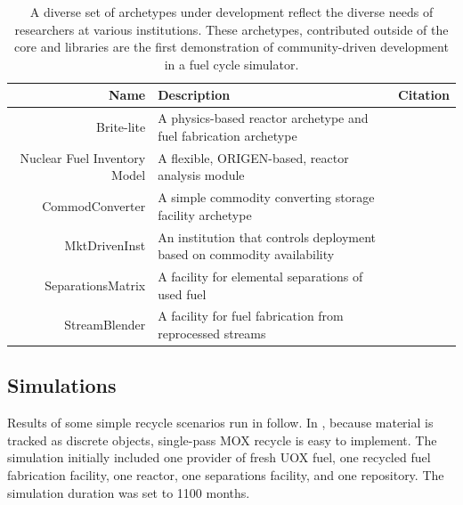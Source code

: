 \begin{table}[h]
\centering
\begin{tabularx}{\textwidth}{|r|X|r|}
\hline
\textbf{Name} & \textbf{Description} & \textbf{Citation} \\
\hline
Brite-lite & A physics-based reactor archetype and fuel fabrication archetype & \cite{brightlite} \\
Nuclear Fuel Inventory Model & A flexible, ORIGEN-based, reactor analysis module & \cite{NFIM} \\
CommodConverter & A simple commodity converting storage facility archetype  & \cite{commodconverter} \\
MktDrivenInst & An institution that controls deployment based on commodity availability & \cite{mktdriveninst} \\
SeparationsMatrix & A facility for elemental separations of used fuel & \cite{streamblender} \\
StreamBlender & A facility for fuel fabrication from reprocessed streams & \cite{streamblender} \\
\hline
\end{tabularx}
\caption{A diverse set of archetypes under development reflect the diverse 
needs of researchers at various institutions. These archetypes, contributed 
outside of the \Cyclus core and \Cycamore libraries are the first demonstration 
of community-driven development in a fuel cycle simulator.}
\label{tab:archetypes}
\end{table}


\subsection{Simulations}


Results of some simple recycle scenarios run in \Cyclus follow.  In \Cyclus,
because material is tracked as discrete objects, single-pass MOX recycle is
easy to implement.  The simulation initially included one provider of fresh
UOX fuel, one recycled fuel fabrication facility, one reactor, one separations
facility, and one repository. The simulation duration was set to 1100 months.

